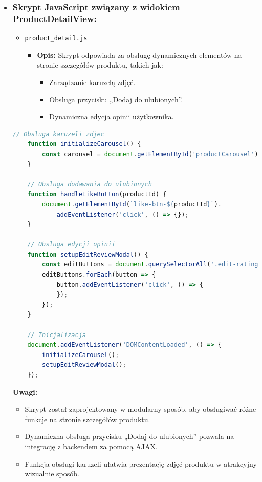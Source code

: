 \documentclass[12pt,a4paper,oneside]{article}
\theoremstyle{definition}
\numberwithin{equation}{section}
\begin{document}
\begin{itemize}
    \item \subsubsection{Skrypt JavaScript związany z widokiem ProductDetailView:}
        \begin{itemize}
            \item \texttt{product\_detail.js}
            \begin{itemize}
                \item \textbf{Opis:} Skrypt odpowiada za obsługę dynamicznych elementów na stronie szczegółów produktu, takich jak:
                \begin{itemize}
                    \item Zarządzanie karuzelą zdjęć.
                    \item Obsługa przycisku „Dodaj do ulubionych”.
                    \item Dynamiczna edycja opinii użytkownika.
                \end{itemize}
            \end{itemize}
        \end{itemize}

        \begin{lstlisting}[language=JavaScript, caption=Skrypt \texttt{product\_detail.js}]
    // Obsluga karuzeli zdjec
    function initializeCarousel() {
        const carousel = document.getElementById('productCarousel');
    }

    // Obsluga dodawania do ulubionych
    function handleLikeButton(productId) {
        document.getElementById(`like-btn-${productId}`).
            addEventListener('click', () => {});
    }

    // Obsluga edycji opinii
    function setupEditReviewModal() {
        const editButtons = document.querySelectorAll('.edit-rating-btn');
        editButtons.forEach(button => {
            button.addEventListener('click', () => {
            });
        });
    }

    // Inicjalizacja
    document.addEventListener('DOMContentLoaded', () => {
        initializeCarousel();
        setupEditReviewModal();
    });
        \end{lstlisting}

        \textbf{Uwagi:}
            \begin{itemize}
                \item Skrypt został zaprojektowany w modularny sposób, aby obsługiwać różne funkcje na stronie szczegółów produktu.
                \item Dynamiczna obsługa przycisku „Dodaj do ulubionych” pozwala na integrację z backendem za pomocą AJAX.
                \item Funkcja obsługi karuzeli ułatwia prezentację zdjęć produktu w atrakcyjny wizualnie sposób.
            \end{itemize}
\end{itemize}
\end{document}
